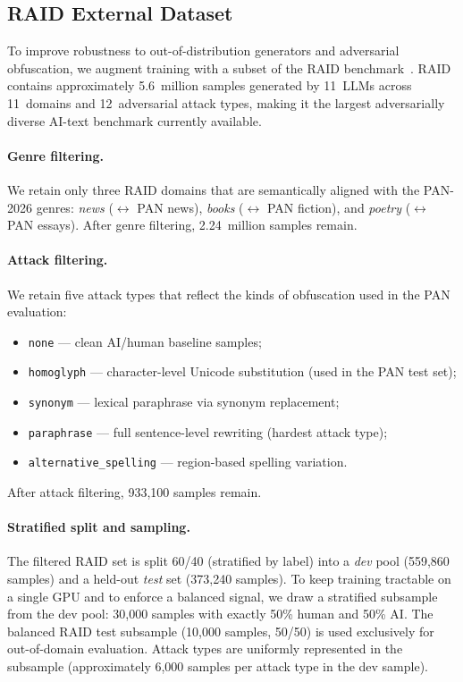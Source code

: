 \subsection{RAID External Dataset}

To improve robustness to out-of-distribution generators and adversarial obfuscation,
we augment training with a subset of the RAID benchmark~\cite{dugan:2024}. RAID
contains approximately 5.6~million samples generated by 11~LLMs across 11~domains
and 12~adversarial attack types, making it the largest adversarially diverse AI-text
benchmark currently available.

\paragraph{Genre filtering.} We retain only three RAID domains that are semantically
aligned with the PAN-2026 genres: \emph{news} ($\leftrightarrow$ PAN news),
\emph{books} ($\leftrightarrow$ PAN fiction), and \emph{poetry} ($\leftrightarrow$ PAN essays).
After genre filtering, 2.24~million samples remain.

\paragraph{Attack filtering.} We retain five attack types that reflect the kinds
of obfuscation used in the PAN evaluation:

\begin{itemize}
  \item \texttt{none} — clean AI/human baseline samples;
  \item \texttt{homoglyph} — character-level Unicode substitution (used in the PAN test set);
  \item \texttt{synonym} — lexical paraphrase via synonym replacement;
  \item \texttt{paraphrase} — full sentence-level rewriting (hardest attack type);
  \item \texttt{alternative\_spelling} — region-based spelling variation.
\end{itemize}

After attack filtering, 933,100 samples remain.

\paragraph{Stratified split and sampling.} The filtered RAID set is split 60/40
(stratified by label) into a \emph{dev} pool (559,860 samples) and a held-out
\emph{test} set (373,240 samples). To keep training tractable on a single GPU and
to enforce a balanced signal, we draw a stratified subsample from the dev pool:
30,000 samples with exactly 50\% human and 50\% AI. The balanced RAID test subsample
(10,000 samples, 50/50) is used exclusively for out-of-domain evaluation. Attack
types are uniformly represented in the subsample (approximately 6,000 samples per
attack type in the dev sample).

